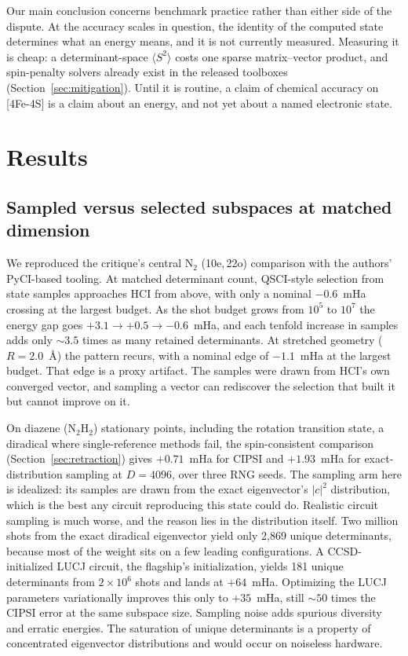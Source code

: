 \documentclass[11pt]{article}
\newcommand{\ssq}{\ensuremath{\langle S^2\rangle}}
\begin{document}
Our main conclusion concerns benchmark practice rather than either side of the dispute. At the accuracy scales in question, the identity of the computed state determines what an energy means, and it is not currently measured. Measuring it is cheap: a determinant-space \ssq{} costs one sparse matrix--vector product, and spin-penalty solvers already exist in the released toolboxes (Section~\ref{sec:mitigation}). Until it is routine, a claim of chemical accuracy on [4Fe-4S] is a claim about an energy, and not yet about a named electronic state.

\section{Results}

\subsection{Sampled versus selected subspaces at matched dimension}\label{sec:nowin}

We reproduced the critique's central N$_2$ (10e,\,22o) comparison with the authors' PyCI-based tooling. At matched determinant count, QSCI-style selection from state samples approaches HCI from above, with only a nominal $-0.6$~mHa crossing at the largest budget. As the shot budget grows from $10^5$ to $10^7$ the energy gap goes $+3.1 \to +0.5 \to -0.6$~mHa, and each tenfold increase in samples adds only ${\sim}3.5$ times as many retained determinants. At stretched geometry ($R=2.0$~\AA) the pattern recurs, with a nominal edge of $-1.1$~mHa at the largest budget. That edge is a proxy artifact. The samples were drawn from HCI's own converged vector, and sampling a vector can rediscover the selection that built it but cannot improve on it.

On diazene (N$_2$H$_2$) stationary points, including the rotation transition state, a diradical where single-reference methods fail, the spin-consistent comparison (Section~\ref{sec:retraction}) gives $+0.71$~mHa for CIPSI and $+1.93$~mHa for exact-distribution sampling at $D=4096$, over three RNG seeds. The sampling arm here is idealized: its samples are drawn from the exact eigenvector's $|c|^2$ distribution, which is the best any circuit reproducing this state could do. Realistic circuit sampling is much worse, and the reason lies in the distribution itself. Two million shots from the exact diradical eigenvector yield only 2{,}869 unique determinants, because most of the weight sits on a few leading configurations. A CCSD-initialized LUCJ circuit, the flagship's initialization, yields 181 unique determinants from $2\times10^6$ shots and lands at $+64$~mHa. Optimizing the LUCJ parameters variationally improves this only to $+35$~mHa, still ${\sim}50$ times the CIPSI error at the same subspace size. Sampling noise adds spurious diversity and erratic energies. The saturation of unique determinants is a property of concentrated eigenvector distributions and would occur on noiseless hardware.
\end{document}
